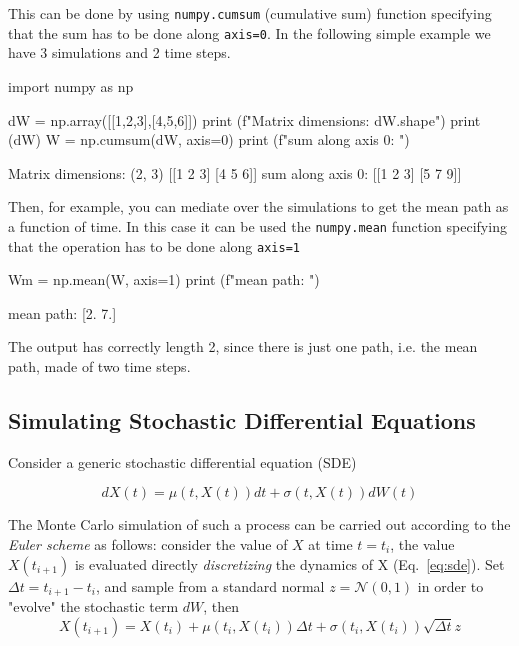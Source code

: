 \documentclass[12pt,a4paper]{book}
\begin{document}
This can be done by using \texttt{numpy.cumsum} (cumulative sum) function specifying that the sum has to be done along \texttt{axis=0}. In the following simple example we have 3 simulations and 2 time steps.

\begin{ipython}
import numpy as np

dW = np.array([[1,2,3],[4,5,6]])
print (f"Matrix dimensions: {dW.shape}")
print (dW)
W = np.cumsum(dW, axis=0)
print (f"sum along axis 0: ")
\end{ipython}
\begin{ioutput}
Matrix dimensions: (2, 3)
[[1 2 3]
[4 5 6]]
sum along axis 0: 
[[1 2 3]
[5 7 9]]
\end{ioutput}

Then, for example, you can mediate over the simulations to get the mean path as a function of time. In this case it can be used the \texttt{numpy.mean} function specifying that the operation has to be done along \texttt{axis=1}

\begin{ipython}
Wm = np.mean(W, axis=1)
print (f"mean path: ")
\end{ipython}
\begin{ioutput}
mean path: 
[2. 7.]
\end{ioutput}

The output has correctly length 2, since there is just one path, i.e. the mean path, made of two time steps.

\subsection{Simulating Stochastic Differential Equations}

Consider a generic stochastic differential equation (SDE)

\begin{equation}
dX(t) = \mu(t,X(t))dt + \sigma(t,X(t))dW(t)
\label{eq:sde}
\end{equation}

The Monte Carlo simulation of such a process can be carried out according to the \emph{Euler scheme} as follows: consider the value of $X$ at time $t=t_i$, the value $X(t_{i+1})$ is evaluated directly \emph{discretizing}  the dynamics of X (Eq.~\ref{eq:sde}). Set $\Delta t = t_{i+1} - t_{i}$, and sample from a standard normal $z = \mathcal{N}(0,1)$ in order to "evolve" the stochastic term $dW$, then 
\begin{equation}
X(t_{i+1}) = X(t_i) + \mu(t_i,X(t_i))\Delta t + \sigma(t_i,X(t_i))\sqrt{\Delta t}z
\end{equation}
\end{document}
